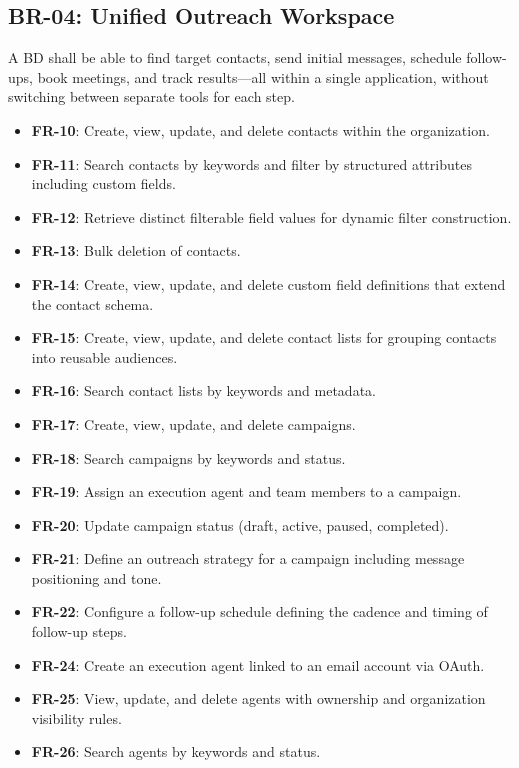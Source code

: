 \documentclass[a4paper]{article}
\begin{document}
\subsection{BR-04: Unified Outreach Workspace}

A BD shall be able to find target contacts, send initial messages,
schedule follow-ups, book meetings, and track results---all within
a single application, without switching between separate tools for
each step.

\begin{itemize}
    \item \textbf{FR-10}: Create, view, update, and delete contacts
    within the organization.
    \item \textbf{FR-11}: Search contacts by keywords and filter by
    structured attributes including custom fields.
    \item \textbf{FR-12}: Retrieve distinct filterable field values
    for dynamic filter construction.
    \item \textbf{FR-13}: Bulk deletion of contacts.
    \item \textbf{FR-14}: Create, view, update, and delete custom
    field definitions that extend the contact schema.
    \item \textbf{FR-15}: Create, view, update, and delete contact
    lists for grouping contacts into reusable audiences.
    \item \textbf{FR-16}: Search contact lists by keywords and
    metadata.
    \item \textbf{FR-17}: Create, view, update, and delete campaigns.
    \item \textbf{FR-18}: Search campaigns by keywords and status.
    \item \textbf{FR-19}: Assign an execution agent and team members
    to a campaign.
    \item \textbf{FR-20}: Update campaign status (draft, active,
    paused, completed).
    \item \textbf{FR-21}: Define an outreach strategy for a campaign
    including message positioning and tone.
    \item \textbf{FR-22}: Configure a follow-up schedule defining
    the cadence and timing of follow-up steps.
    \item \textbf{FR-24}: Create an execution agent linked to an
    email account via OAuth.
    \item \textbf{FR-25}: View, update, and delete agents with
    ownership and organization visibility rules.
    \item \textbf{FR-26}: Search agents by keywords and status.

\end{itemize}
\end{document}
